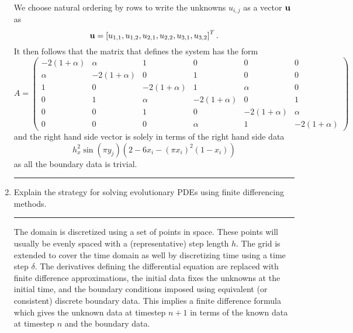 \documentclass[10pt]{article}
\begin{document}
\begin{enumerate}
  We choose natural ordering by rows to write the unknowns $u_{i,j}$
  as a vector ${\bf u}$ as
  \begin{equation*}
    {\bf u} = \left[ u_{1,1}, u_{1,2}, u_{2,1}, u_{2,2}, u_{3,1},
      u_{3,2} \right]^T.
  \end{equation*}
  It then follows that the matrix that defines the system has the form
  \begin{equation*}
    A =
    \begin{pmatrix}
      -2 ( 1 + \alpha ) & \alpha & 1 & 0 & 0 & 0 \\
      \alpha & -2 ( 1 + \alpha ) & 0 & 1 & 0 & 0 \\
      1 & 0 & -2 ( 1 + \alpha ) & 1 & \alpha & 0 \\
      0 & 1 & \alpha & -2 ( 1 + \alpha ) & 0 & 1 \\
      0 & 0 & 1 & 0 & -2 ( 1 + \alpha ) & \alpha \\
      0 & 0 & 0 & \alpha & 1 &  -2 ( 1 + \alpha ) 
    \end{pmatrix}
  \end{equation*}
  and the right hand side vector is solely in terms of the right hand
  side data
  \begin{equation*}
    h_x^2 \sin ( \pi y_j ) \left( 2 - 6 x_i - (\pi x_i)^2 (1 - x_i) \right)
  \end{equation*}
  as all the boundary data is trivial.
  \begin{center}
    \rule{0.9\textwidth}{.1pt}
  \end{center}
\item Explain the strategy for solving evolutionary PDEs using finite
  differencing methods.
  \begin{center}
    \rule{0.9\textwidth}{.1pt}
  \end{center}
  The domain is discretized using a set of points in space. These
  points will usually be evenly spaced with a (representative) step
  length $h$. The grid is extended to cover the time domain as well by
  discretizing time using a time step $\delta$. The derivatives
  defining the differential equation are replaced with finite
  difference approximations, the initial data fixes the unknowns at
  the initial time, and the boundary conditions imposed using
  equivalent (or consistent) discrete boundary data. This implies a
  finite difference formula which gives the unknown data at timestep
  $n+1$ in terms of the known data at timestep $n$ and the boundary
  data. 


\end{enumerate}
\end{document}

